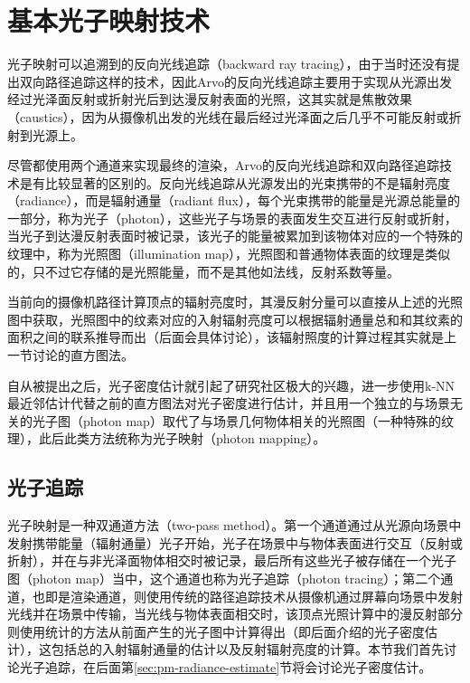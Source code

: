 \section{基本光子映射技术}\label{sec:pm-regular-pm}
光子映射可以追溯到\cite{a:Backwardraytracing}的反向光线追踪（backward ray tracing），由于当时还没有提出双向路径追踪这样的技术，因此Arvo的反向光线追踪主要用于实现从光源出发经过光泽面反射或折射光后到达漫反射表面的光照，这其实就是焦散效果（caustics），因为从摄像机出发的光线在最后经过光泽面之后几乎不可能反射或折射到光源上。

尽管都使用两个通道来实现最终的渲染，Arvo的反向光线追踪和双向路径追踪技术是有比较显著的区别的。反向光线追踪从光源发出的光束携带的不是辐射亮度（radiance），而是辐射通量（radiant flux），每个光束携带的能量是光源总能量的一部分，称为光子（photon），这些光子与场景的表面发生交互进行反射或折射，当光子到达漫反射表面时被记录，该光子的能量被累加到该物体对应的一个特殊的纹理中，称为光照图（illumination map），光照图和普通物体表面的纹理是类似的，只不过它存储的是光照能量，而不是其他如法线，反射系数等量。

当前向的摄像机路径计算顶点的辐射亮度时，其漫反射分量可以直接从上述的光照图中获取，光照图中的纹素对应的入射辐射亮度可以根据辐射通量总和和其纹素的面积之间的联系推导而出（后面会具体讨论），该辐射照度的计算过程其实就是上一节讨论的直方图法。

自从被提出之后，光子密度估计就引起了研究社区极大的兴趣，\cite{a:GlobalIlluminationusingPhotonMaps}进一步使用k-NN最近邻估计代替之前的直方图法对光子密度进行估计，并且用一个独立的与场景无关的光子图（photon map）取代了与场景几何物体相关的光照图（一种特殊的纹理），此后此类方法统称为光子映射（photon mapping）。




\subsection{光子追踪}\label{sec:pm-photon-tracing}
光子映射是一种双通道方法（two-pass method）。第一个通道通过从光源向场景中发射携带能量（辐射通量）光子开始，光子在场景中与物体表面进行交互（反射或折射），并在与非光泽面物体相交时被记录，最后所有这些光子被存储在一个光子图（photon map）当中，这个通道也称为光子追踪（photon tracing）；第二个通道，也即是渲染通道，则使用传统的路径追踪技术从摄像机通过屏幕向场景中发射光线并在场景中传输，当光线与物体表面相交时，该顶点光照计算中的漫反射部分则使用统计的方法从前面产生的光子图中计算得出（即后面介绍的光子密度估计），这包括总的入射辐射通量的估计以及反射辐射亮度的计算。本节我们首先讨论光子追踪，在后面第\ref{sec:pm-radiance-estimate}节将会讨论光子密度估计。


